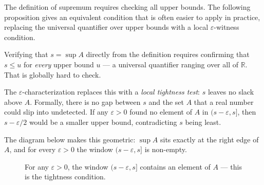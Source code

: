 The definition of supremum requires checking all upper bounds. The
following proposition gives an equivalent condition that is often easier
to apply in practice, replacing the universal quantifier over upper bounds
with a local $\varepsilon$-witness condition.

\begin{remark*}
Verifying that $s = \sup A$ directly from the definition requires confirming
that $s \le u$ for \emph{every} upper bound $u$ --- a universal quantifier
ranging over all of $\mathbb{R}$.  That is globally hard to check.

The $\varepsilon$-characterization replaces this with a \emph{local tightness
test}: $s$ leaves no slack above $A$.  Formally, there is no gap between
$s$ and the set $A$ that a real number could slip into undetected.  If
any $\varepsilon > 0$ found no element of $A$ in $(s-\varepsilon, s]$,
then $s - \varepsilon/2$ would be a smaller upper bound, contradicting
$s$ being least.

\medskip

The diagram below makes this geometric:
$\sup A$ sits exactly at the right edge of $A$, and for every
$\varepsilon > 0$ the window $(s-\varepsilon, s]$ is non-empty.

\begin{figure}[h]
\centering
{}
\caption{For any $\varepsilon > 0$, the window $(s-\varepsilon, s]$ contains an
element of $A$ --- this is the tightness condition.}
\label{fig:sup-eps-char}
\end{figure}
\end{remark*}

